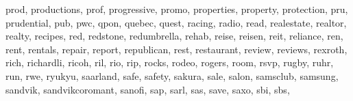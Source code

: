 \documentclass[letterpaper,10pt,english]{sphinxmanual}
\begin{document}
\begin{fulllineitems}
\begin{fulllineitems}
\textquotesingle{}prod\textquotesingle{}, \textquotesingle{}productions\textquotesingle{}, \textquotesingle{}prof\textquotesingle{}, \textquotesingle{}progressive\textquotesingle{}, \textquotesingle{}promo\textquotesingle{}, \textquotesingle{}properties\textquotesingle{}, \textquotesingle{}property\textquotesingle{}, \textquotesingle{}protection\textquotesingle{}, \textquotesingle{}pru\textquotesingle{}, \textquotesingle{}prudential\textquotesingle{}, \textquotesingle{}pub\textquotesingle{}, \textquotesingle{}pwc\textquotesingle{}, \textquotesingle{}qpon\textquotesingle{}, \textquotesingle{}quebec\textquotesingle{}, \textquotesingle{}quest\textquotesingle{}, \textquotesingle{}racing\textquotesingle{}, \textquotesingle{}radio\textquotesingle{}, \textquotesingle{}read\textquotesingle{}, \textquotesingle{}realestate\textquotesingle{}, \textquotesingle{}realtor\textquotesingle{}, \textquotesingle{}realty\textquotesingle{}, \textquotesingle{}recipes\textquotesingle{}, \textquotesingle{}red\textquotesingle{}, \textquotesingle{}redstone\textquotesingle{}, \textquotesingle{}redumbrella\textquotesingle{}, \textquotesingle{}rehab\textquotesingle{}, \textquotesingle{}reise\textquotesingle{}, \textquotesingle{}reisen\textquotesingle{}, \textquotesingle{}reit\textquotesingle{}, \textquotesingle{}reliance\textquotesingle{}, \textquotesingle{}ren\textquotesingle{}, \textquotesingle{}rent\textquotesingle{}, \textquotesingle{}rentals\textquotesingle{}, \textquotesingle{}repair\textquotesingle{}, \textquotesingle{}report\textquotesingle{}, \textquotesingle{}republican\textquotesingle{}, \textquotesingle{}rest\textquotesingle{}, \textquotesingle{}restaurant\textquotesingle{}, \textquotesingle{}review\textquotesingle{}, \textquotesingle{}reviews\textquotesingle{}, \textquotesingle{}rexroth\textquotesingle{}, \textquotesingle{}rich\textquotesingle{}, \textquotesingle{}richardli\textquotesingle{}, \textquotesingle{}ricoh\textquotesingle{}, \textquotesingle{}ril\textquotesingle{}, \textquotesingle{}rio\textquotesingle{}, \textquotesingle{}rip\textquotesingle{}, \textquotesingle{}rocks\textquotesingle{}, \textquotesingle{}rodeo\textquotesingle{}, \textquotesingle{}rogers\textquotesingle{}, \textquotesingle{}room\textquotesingle{}, \textquotesingle{}rsvp\textquotesingle{}, \textquotesingle{}rugby\textquotesingle{}, \textquotesingle{}ruhr\textquotesingle{}, \textquotesingle{}run\textquotesingle{}, \textquotesingle{}rwe\textquotesingle{}, \textquotesingle{}ryukyu\textquotesingle{}, \textquotesingle{}saarland\textquotesingle{}, \textquotesingle{}safe\textquotesingle{}, \textquotesingle{}safety\textquotesingle{}, \textquotesingle{}sakura\textquotesingle{}, \textquotesingle{}sale\textquotesingle{}, \textquotesingle{}salon\textquotesingle{}, \textquotesingle{}samsclub\textquotesingle{}, \textquotesingle{}samsung\textquotesingle{}, \textquotesingle{}sandvik\textquotesingle{}, \textquotesingle{}sandvikcoromant\textquotesingle{}, \textquotesingle{}sanofi\textquotesingle{}, \textquotesingle{}sap\textquotesingle{}, \textquotesingle{}sarl\textquotesingle{}, \textquotesingle{}sas\textquotesingle{}, \textquotesingle{}save\textquotesingle{}, \textquotesingle{}saxo\textquotesingle{}, \textquotesingle{}sbi\textquotesingle{}, \textquotesingle{}sbs\textquotesingle{}, 
\end{fulllineitems}
\end{fulllineitems}
\end{document}
